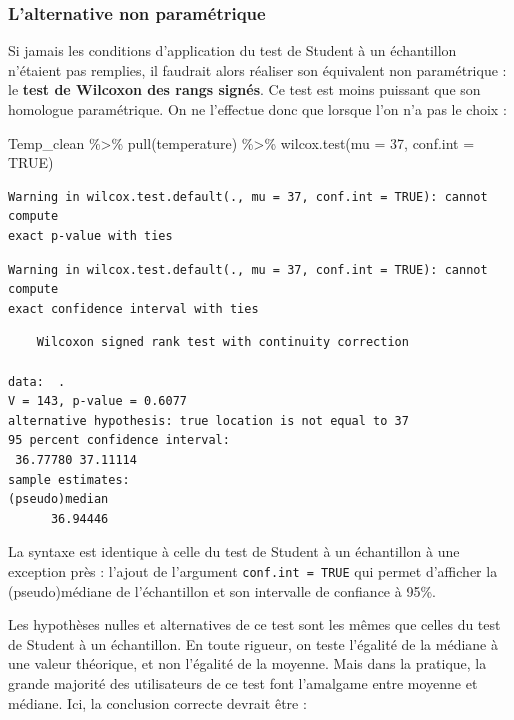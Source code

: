 \documentclass[
  a4paper,
]{article}
\newenvironment{Shaded}{\begin{snugshade}}{\end{snugshade}}
\newcommand{\AttributeTok}[1]{\textcolor[rgb]{0.00,0.34,0.68}{#1}}
\newcommand{\ConstantTok}[1]{\textcolor[rgb]{0.67,0.33,0.00}{#1}}
\newcommand{\DecValTok}[1]{\textcolor[rgb]{0.69,0.50,0.00}{#1}}
\newcommand{\FunctionTok}[1]{\textcolor[rgb]{0.39,0.29,0.61}{#1}}
\newcommand{\NormalTok}[1]{\textcolor[rgb]{0.12,0.11,0.11}{#1}}
\newcommand{\SpecialCharTok}[1]{\textcolor[rgb]{0.24,0.68,0.91}{#1}}
\begin{document}
\hypertarget{lalternative-non-paramuxe9trique}{%
\subsubsection{L'alternative non paramétrique}\label{lalternative-non-paramuxe9trique}}

Si jamais les conditions d'application du test de Student à un échantillon n'étaient pas remplies, il faudrait alors réaliser son équivalent non paramétrique : le \textbf{test de Wilcoxon des rangs signés}. Ce test est moins puissant que son homologue paramétrique. On ne l'effectue donc que lorsque l'on n'a pas le choix :

\begin{Shaded}
\begin{Highlighting}[]
\NormalTok{Temp\_clean }\SpecialCharTok{\%\textgreater{}\%} 
  \FunctionTok{pull}\NormalTok{(temperature) }\SpecialCharTok{\%\textgreater{}\%} 
  \FunctionTok{wilcox.test}\NormalTok{(}\AttributeTok{mu =} \DecValTok{37}\NormalTok{, }\AttributeTok{conf.int =} \ConstantTok{TRUE}\NormalTok{)}
\end{Highlighting}
\end{Shaded}

\begin{verbatim}
Warning in wilcox.test.default(., mu = 37, conf.int = TRUE): cannot compute
exact p-value with ties
\end{verbatim}

\begin{verbatim}
Warning in wilcox.test.default(., mu = 37, conf.int = TRUE): cannot compute
exact confidence interval with ties
\end{verbatim}

\begin{verbatim}
    Wilcoxon signed rank test with continuity correction

data:  .
V = 143, p-value = 0.6077
alternative hypothesis: true location is not equal to 37
95 percent confidence interval:
 36.77780 37.11114
sample estimates:
(pseudo)median 
      36.94446 
\end{verbatim}

La syntaxe est identique à celle du test de Student à un échantillon à une exception près : l'ajout de l'argument \texttt{conf.int\ =\ TRUE} qui permet d'afficher la (pseudo)médiane de l'échantillon et son intervalle de confiance à 95\%.

Les hypothèses nulles et alternatives de ce test sont les mêmes que celles du test de Student à un échantillon. En toute rigueur, on teste l'égalité de la médiane à une valeur théorique, et non l'égalité de la moyenne. Mais dans la pratique, la grande majorité des utilisateurs de ce test font l'amalgame entre moyenne et médiane. Ici, la conclusion correcte devrait être :
\end{document}
